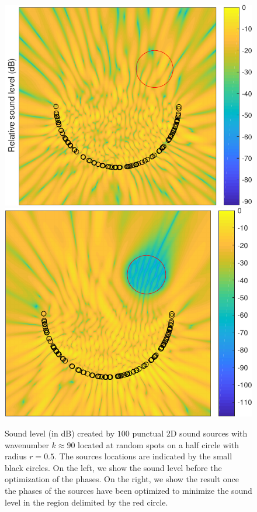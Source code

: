 \documentclass{article}
\begin{document}
\begin{figure}
	\centering	
	\includegraphics[scale = 0.45]{epsFig1_new}		
	\includegraphics[scale = 0.45]{epsFig2_new}
	\caption{Sound level (in dB) created by $100$ punctual 2D sound sources with wavenumber $k\approx 90$ located at random spots on a half circle with radius $r = 0.5$. The sources locations are indicated by the small black circles. On the left, we show the sound level before the optimization of the phases. On the right, we show the result once the phases of the sources have been optimized to minimize the sound level in the region delimited by the red circle. }
	\label{figMinimizationHelmholtz}
\end{figure}




\end{document}
